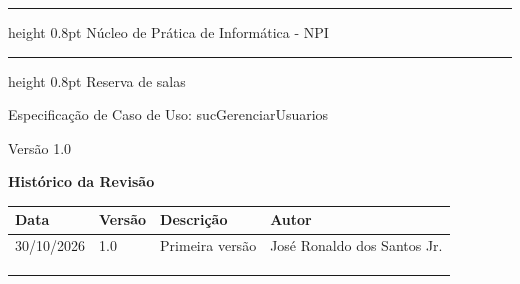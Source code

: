 \documentclass[12pt,a4paper]{article}
\newcommand{\ucnome}{sucGerenciarUsuarios}
\newcommand{\ucprojeto}{Reserva de salas}
\newcommand{\ucversao}{1.0}
\newcommand{\ucdata}{30/10/2026}
\newcommand{\ucautor}{José Ronaldo dos Santos Jr.}
\newcommand{\ucorgao}{Núcleo de Prática de Informática - NPI}
\newcommand{\uctitulo}{Especificação de Caso de Uso: \ucnome}
\begin{document}

\thispagestyle{empty}
\vspace*{-3.3cm}
{\bfseries
  \hrule height 0.8pt
  \vspace{10pt}
  \raggedleft \Large \ucorgao \par
  \vspace{10pt}
  \hrule height 0.8pt
  \vspace{36pt}
  \raggedleft \Large \ucprojeto \par
  \vspace{12pt}
  \raggedleft \Large \uctitulo \par
  \vspace{36pt}
  \raggedleft \large Versão \ucversao \par
}
\newpage


\begin{center}
  {\Large\bfseries Histórico da Revisão}
\end{center}

\vspace{\baselineskip}

{\small
\noindent
\begin{tabularx}{\textwidth}{|p{2.6cm}|p{1.6cm}|X|p{3.6cm}|}
  \hline
  \centering\textbf{Data} & \centering\textbf{Versão} & \centering\textbf{Descrição}
    & \centering\arraybackslash\textbf{Autor} \\
  \hline
  \ucdata & \ucversao & Primeira versão & \ucautor \\
  \hline
  & & & \\
  \hline
  & & & \\
  \hline
  & & & \\
  \hline
\end{tabularx}
\par}

\vspace{\baselineskip}

{\tableofcontents\par}
\thispagestyle{fancy}
\newpage
\end{document}
